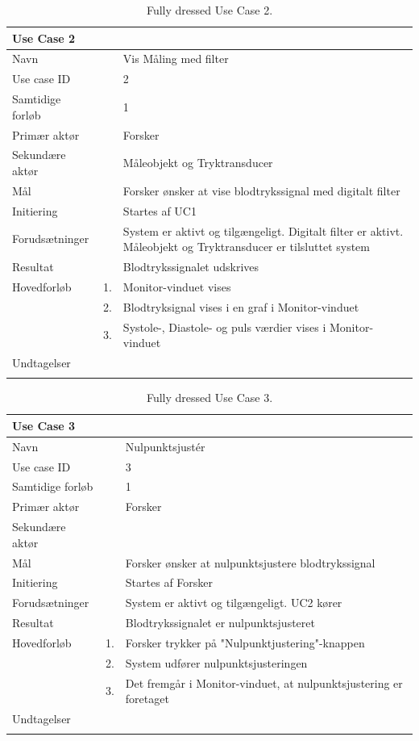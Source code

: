 \begin{longtabu} to  %
    {\large \textbf{Use Case 2}} && \\
    \toprule
    Navn &&    Vis Måling med filter\\
    Use case ID &&    2\\
    Samtidige forløb &&    1\\
    Primær aktør &&    Forsker\\
    Sekundære aktør &&	 Måleobjekt og Tryktransducer\\
    Mål &&    Forsker ønsker at vise blodtrykssignal med digitalt filter\\
    Initiering &&	Startes af UC1\\
    Forudsætninger &&  System er aktivt og tilgængeligt. Digitalt filter er aktivt. Måleobjekt og Tryktransducer er tilsluttet system\\
    Resultat &&		Blodtrykssignalet udskrives                         \\ \midrule
    Hovedforløb &    1. &    Monitor-vinduet vises\\[-1ex]	
    			&    2. &    Blodtryksignal vises i en graf i Monitor-vinduet\\[-1ex]
    			&	 3.	&	 Systole-, Diastole- og puls værdier vises i Monitor-vinduet\newline\\ \midrule
                
    Undtagelser &    &   \\ \bottomrule
\caption{Fully dressed Use Case 2.}
\label{UC2}
\end{longtabu}


\begin{longtabu} to  %
    {\large \textbf{Use Case 3}} && \\
    \toprule
    Navn &&    Nulpunktsjustér\\
    Use case ID &&    3\\
    Samtidige forløb &&    1\\
    Primær aktør &&    Forsker\\
    Sekundære aktør && \\
    Mål &&    Forsker ønsker at nulpunktsjustere blodtrykssignal\\
    Initiering &&	Startes af Forsker\\
    Forudsætninger &&  System er aktivt og tilgængeligt. UC2 kører \\    Resultat &&		Blodtrykssignalet er nulpunktsjusteret\\ \midrule
    Hovedforløb &    1. &    Forsker trykker på "Nulpunktjustering"\--knappen\\[-1ex]   						 	
                &    2. &    System udfører nulpunktsjusteringen\\[-1ex]
                &	 3.	&	 Det fremgår i Monitor-vinduet, at nulpunktsjustering er foretaget\newline\\ \midrule
                
    Undtagelser &     &      \\ \bottomrule
\caption{Fully dressed Use Case 3.}
\label{UC3}
\end{longtabu}

